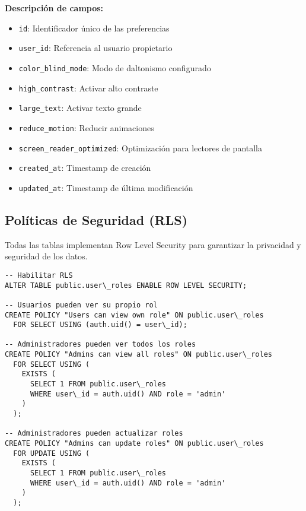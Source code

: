 \documentclass[12pt,a4paper]{article}
\begin{document}
\textbf{Descripción de campos:}
\begin{itemize}
    \item \texttt{id}: Identificador único de las preferencias
    \item \texttt{user\_id}: Referencia al usuario propietario
    \item \texttt{color\_blind\_mode}: Modo de daltonismo configurado
    \item \texttt{high\_contrast}: Activar alto contraste
    \item \texttt{large\_text}: Activar texto grande
    \item \texttt{reduce\_motion}: Reducir animaciones
    \item \texttt{screen\_reader\_optimized}: Optimización para lectores de pantalla
    \item \texttt{created\_at}: Timestamp de creación
    \item \texttt{updated\_at}: Timestamp de última modificación
\end{itemize}

\subsection{Políticas de Seguridad (RLS)}

Todas las tablas implementan Row Level Security para garantizar la privacidad y seguridad de los datos.

\begin{lstlisting}[caption=Políticas RLS para user\_roles]
-- Habilitar RLS
ALTER TABLE public.user\_roles ENABLE ROW LEVEL SECURITY;

-- Usuarios pueden ver su propio rol
CREATE POLICY "Users can view own role" ON public.user\_roles
  FOR SELECT USING (auth.uid() = user\_id);

-- Administradores pueden ver todos los roles
CREATE POLICY "Admins can view all roles" ON public.user\_roles
  FOR SELECT USING (
    EXISTS (
      SELECT 1 FROM public.user\_roles 
      WHERE user\_id = auth.uid() AND role = 'admin'
    )
  );

-- Administradores pueden actualizar roles
CREATE POLICY "Admins can update roles" ON public.user\_roles
  FOR UPDATE USING (
    EXISTS (
      SELECT 1 FROM public.user\_roles 
      WHERE user\_id = auth.uid() AND role = 'admin'
    )
  );
\end{lstlisting}
\end{document}
